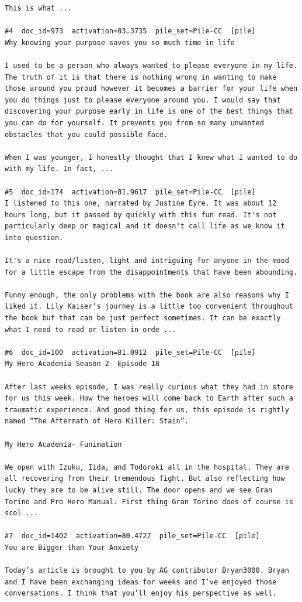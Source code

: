 \begin{verbatim}
This is what ...

#4  doc_id=973  activation=83.3735  pile_set=Pile-CC  [pile]
Why knowing your purpose saves you so much time in life

I used to be a person who always wanted to please everyone in my life. The truth of it is that there is nothing wrong in wanting to make those around you proud however it becomes a barrier for your life when you do things just to please everyone around you. I would say that discovering your purpose early in life is one of the best things that you can do for yourself. It prevents you from so many unwanted obstacles that you could possible face.

When I was younger, I honestly thought that I knew what I wanted to do with my life. In fact, ...

#5  doc_id=174  activation=81.9617  pile_set=Pile-CC  [pile]
I listened to this one, narrated by Justine Eyre. It was about 12 hours long, but it passed by quickly with this fun read. It's not particularly deep or magical and it doesn't call life as we know it into question.

It's a nice read/listen, light and intriguing for anyone in the mood for a little escape from the disappointments that have been abounding.

Funny enough, the only problems with the book are also reasons why I liked it. Lily Kaiser's journey is a little too convenient throughout the book but that can be just perfect sometimes. It can be exactly what I need to read or listen in orde ...

#6  doc_id=100  activation=81.0912  pile_set=Pile-CC  [pile]
My Hero Academia Season 2- Episode 18

After last weeks episode, I was really curious what they had in store for us this week. How the heroes will come back to Earth after such a traumatic experience. And good thing for us, this episode is rightly named “The Aftermath of Hero Killer: Stain”.

My Hero Academia- Funimation

We open with Izuku, Iida, and Todoroki all in the hospital. They are all recovering from their tremendous fight. But also reflecting how lucky they are to be alive still. The door opens and we see Gran Torino and Pro Hero Manual. First thing Gran Torino does of course is scol ...

#7  doc_id=1402  activation=80.4727  pile_set=Pile-CC  [pile]
You are Bigger than Your Anxiety

Today’s article is brought to you by AG contributor Bryan3000. Bryan and I have been exchanging ideas for weeks and I’ve enjoyed those conversations. I think that you’ll enjoy his perspective as well.


\end{verbatim}

